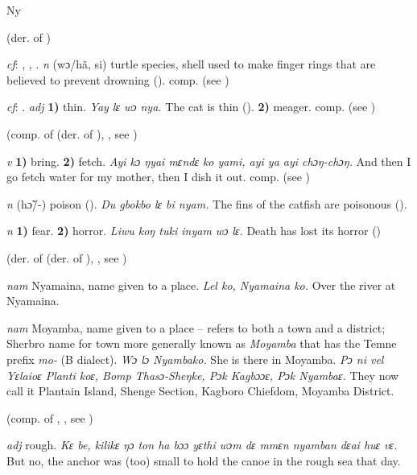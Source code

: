 \begin{letter}{Ny}

 (der. of )

 \textit{cf}: , , . \textit{n} (wɔ/hã, si) turtle species, shell used to make finger rings that are believed to prevent drowning (\citealt{Pichl1967}). comp.  (see ) 

 \textit{cf}: . \textit{adj} \textbf{1)} thin. \textit{Yay lɛ wɔ nya.} The cat is thin (\citealt{Pichl1967}). \textbf{2)} meager. comp.  (see ) 

 (comp. of  (der. of ), , see ) 

 \textit{v} \textbf{1)} bring. \textbf{2)} fetch. \textit{Ayi kɔ ŋyai mɛndɛ ko yami, ayi ya ayi chɔŋ-chɔŋ.} And then I go fetch water for my mother, then I dish it out. comp.  (see ) 

 \textit{n} (hɔ̃/-) poison (\citealt{Pichl1967}). \textit{Du gbokbo lɛ bi nyam.} The fins of the catfish are poisonous (\citealt{Pichl1967}). 

 \textit{n} \textbf{1)} fear. \textbf{2)} horror. \textit{Liwu koŋ tuki inyam wɔ lɛ.} Death has lost its horror (\citealt{Pichl1967})

 (der. of  (der. of ), , see ) 

 \textit{nam} Nyamaina, name given to a place. \textit{Lel ko, Nyamaina ko.} Over the river at Nyamaina.

 \textit{nam} Moyamba, name given to a place – refers to both a town and a district; Sherbro name for town more generally known as \textit{Moyamba} that has the Temne prefix \textit{mo-} (B dialect). \textit{Wɔ lɔ Nyambako.} She is there in Moyamba. \textit{Pɔ ni vel Yɛlaioɛ Planti koɛ, Bomp Thasɔ-Sheŋke, Pɔk Kagbɔɔɛ, Pɔk Nyambaɛ.} They now call it Plantain Island, Shenge Section, Kagboro Chiefdom, Moyamba District.

 (comp. of , , see ) 

 \textit{adj} rough. \textit{Kɛ be, kilikɛ ŋɔ ton ha bɔɔ yɛthi wɔm dɛ mmɛn nyamban dɛai huɛ vɛ.} But no, the anchor was (too) small to hold the canoe in the rough sea that day.


\end{letter}
